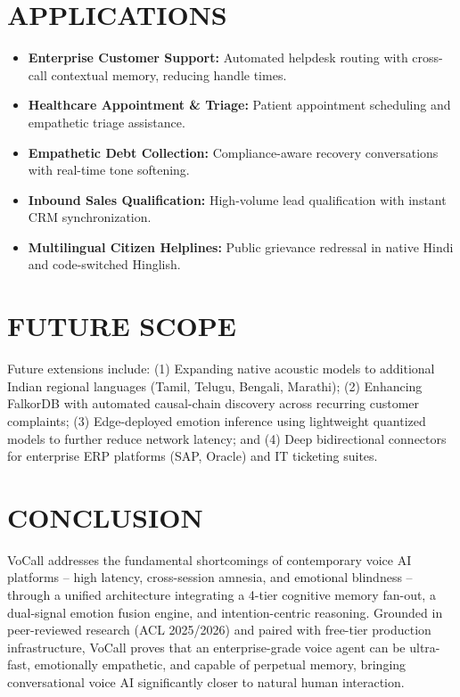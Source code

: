 \documentclass[12pt,a4paper]{article}
\begin{document}
\section{APPLICATIONS}
\begin{itemize}
    \item \textbf{Enterprise Customer Support:} Automated helpdesk routing with cross-call contextual memory, reducing handle times.
    \item \textbf{Healthcare Appointment \& Triage:} Patient appointment scheduling and empathetic triage assistance.
    \item \textbf{Empathetic Debt Collection:} Compliance-aware recovery conversations with real-time tone softening.
    \item \textbf{Inbound Sales Qualification:} High-volume lead qualification with instant CRM synchronization.
    \item \textbf{Multilingual Citizen Helplines:} Public grievance redressal in native Hindi and code-switched Hinglish.
\end{itemize}

\section{FUTURE SCOPE}
Future extensions include: (1) Expanding native acoustic models to additional Indian regional languages (Tamil, Telugu, Bengali, Marathi); (2) Enhancing FalkorDB with automated causal-chain discovery across recurring customer complaints; (3) Edge-deployed emotion inference using lightweight quantized models to further reduce network latency; and (4) Deep bidirectional connectors for enterprise ERP platforms (SAP, Oracle) and IT ticketing suites.

\section{CONCLUSION}
VoCall addresses the fundamental shortcomings of contemporary voice AI platforms -- high latency, cross-session amnesia, and emotional blindness -- through a unified architecture integrating a 4-tier cognitive memory fan-out, a dual-signal emotion fusion engine, and intention-centric reasoning. Grounded in peer-reviewed research (ACL 2025/2026) and paired with free-tier production infrastructure, VoCall proves that an enterprise-grade voice agent can be ultra-fast, emotionally empathetic, and capable of perpetual memory, bringing conversational voice AI significantly closer to natural human interaction.
\end{document}
